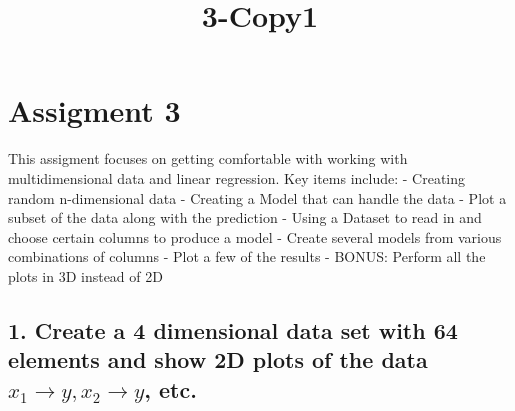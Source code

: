 \documentclass[11pt]{article}
\title{3-Copy1}
\begin{document}
    
    
    \maketitle
    
    

    
    \section{Assigment 3}\label{assigment-3}

This assigment focuses on getting comfortable with working with
multidimensional data and linear regression. Key items include: -
Creating random n-dimensional data - Creating a Model that can handle
the data - Plot a subset of the data along with the prediction - Using a
Dataset to read in and choose certain columns to produce a model -
Create several models from various combinations of columns - Plot a few
of the results - BONUS: Perform all the plots in 3D instead of 2D

    \subsection{\texorpdfstring{1. Create a 4 dimensional data set with 64
elements and show 2D plots of the data
\(x_1 \rightarrow y, x_2 \rightarrow y\),
etc.}{1. Create a 4 dimensional data set with 64 elements and show 2D plots of the data x\_1 \textbackslash{}rightarrow y, x\_2 \textbackslash{}rightarrow y, etc.}}\label{create-a-4-dimensional-data-set-with-64-elements-and-show-2d-plots-of-the-data-x_1-rightarrow-y-x_2-rightarrow-y-etc.}
\end{document}
